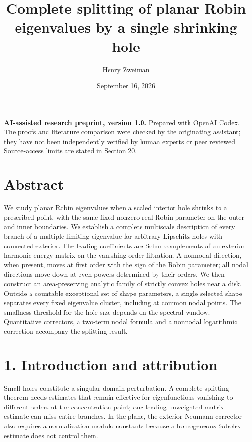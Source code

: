 \documentclass[11pt]{article}
\title{Complete splitting of planar Robin eigenvalues by a single shrinking hole}
\author{Henry Zweiman}
\date{September 16, 2026}
\begin{document}
\maketitle
\textbf{AI-assisted research preprint, version 1.0.} Prepared with
OpenAI Codex. The proofs and literature comparison were checked by the
originating assistant; they have not been independently verified by
human experts or peer reviewed. Source-access limits are stated in
Section 20.

\section{Abstract}\label{abstract}

We study planar Robin eigenvalues when a scaled interior hole shrinks to
a prescribed point, with the same fixed nonzero real Robin parameter on
the outer and inner boundaries. We establish a complete multiscale
description of every branch of a multiple limiting eigenvalue for
arbitrary Lipschitz holes with connected exterior. The leading
coefficients are Schur complements of an exterior harmonic energy matrix
on the vanishing-order filtration. A nonnodal direction, when present,
moves at first order with the sign of the Robin parameter; all nodal
directions move down at even powers determined by their orders. We then
construct an area-preserving analytic family of strictly convex holes
near a disk. Outside a countable exceptional set of shape parameters, a
single selected shape separates every fixed eigenvalue cluster,
including at common nodal points. The smallness threshold for the hole
size depends on the spectral window. Quantitative correctors, a two-term
nodal formula and a nonnodal logarithmic correction accompany the
splitting result.

\section{1. Introduction and
attribution}\label{introduction-and-attribution}

Small holes constitute a singular domain perturbation. A complete
splitting theorem needs estimates that remain effective for
eigenfunctions vanishing to different orders at the concentration point;
one leading unweighted matrix estimate can miss entire branches. In the
plane, the exterior Neumann corrector also requires a normalization
modulo constants because a homogeneous Sobolev estimate does not control
them.
\end{document}
